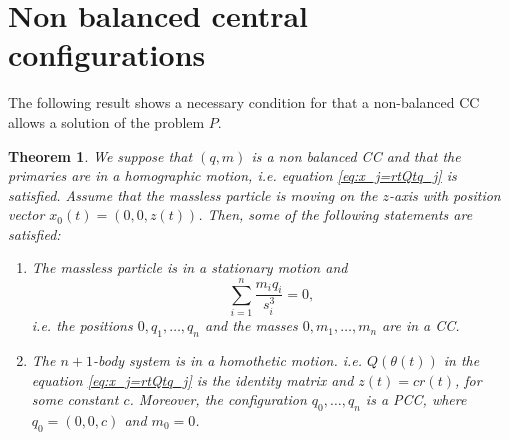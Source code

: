 \documentclass[twoside]{article}
\newtheorem{thm}{Theorem}[section]
\theoremstyle{remark}
\begin{document}
\section{Non balanced central configurations}

The following result shows a necessary condition for that  a non-balanced CC allows a solution of the problem $P$.

\begin{thm}\label{thm:no.admisible.movimiento}
We suppose that $(q,m)$ is a non balanced CC and  that the primaries are in a homographic motion, i.e.  equation \eqref{eq:x_j=rtQtq_j} is satisfied. Assume that the massless particle is moving on the $z$-axis with position vector $x_0(t)=(0,0,z(t))$. Then, some of the following statements are satisfied:
\begin{enumerate}
 \item\label{it:z==0} The massless particle is in a stationary motion and
 \begin{equation}\label{eq:acel.centrmasa=0}
  \sum_{i=1}^{n}\frac{m_iq_i}{s_i^3}=0,
 \end{equation}
 i.e. the positions $0,q_1,\ldots,q_n$ and the masses $0,m_1,\ldots,m_n$ are in a CC.
 \item\label{it:z=r} The $n+1$-body system is in a homothetic motion. i.e. $Q(\theta(t))$ in the equation \eqref{eq:x_j=rtQtq_j} is the identity matrix and $z(t)=cr(t)$, for some constant $c$. Moreover, the configuration $q_0,\ldots,q_n$ is a PCC, where $q_0=(0,0,c)$ and $m_0=0$.
\end{enumerate}
\end{thm}
\end{document}
